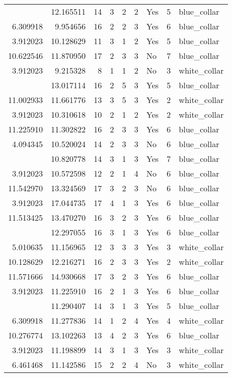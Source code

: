 \documentclass[
]{article}
\begin{document}
\begin{longtable}[t]{rrrrrllrl}
\addlinespace
10.128629 & 12.165511 & 14 & 3 & 2 & 2 & Yes & 5 & blue\_collar\\
6.309918 & 9.954656 & 16 & 2 & 2 & 3 & Yes & 6 & blue\_collar\\
3.912023 & 10.128629 & 11 & 3 & 1 & 2 & Yes & 5 & blue\_collar\\
10.622546 & 11.870950 & 17 & 2 & 3 & 3 & No & 7 & blue\_collar\\
3.912023 & 9.215328 & 8 & 1 & 1 & 2 & No & 3 & white\_collar\\
\addlinespace
10.405777 & 13.017114 & 16 & 2 & 5 & 3 & Yes & 5 & blue\_collar\\
11.002933 & 11.661776 & 13 & 3 & 5 & 3 & Yes & 2 & white\_collar\\
3.912023 & 10.310618 & 10 & 2 & 1 & 2 & Yes & 2 & white\_collar\\
11.225910 & 11.302822 & 16 & 2 & 3 & 3 & Yes & 6 & blue\_collar\\
4.094345 & 10.520024 & 14 & 2 & 3 & 3 & No & 6 & blue\_collar\\
\addlinespace
3.912023 & 10.820778 & 14 & 3 & 1 & 3 & Yes & 7 & blue\_collar\\
3.912023 & 10.572598 & 12 & 2 & 1 & 4 & No & 6 & blue\_collar\\
11.542970 & 13.324569 & 17 & 3 & 2 & 3 & No & 6 & blue\_collar\\
3.912023 & 17.044735 & 17 & 4 & 1 & 3 & Yes & 6 & blue\_collar\\
11.513425 & 13.470270 & 16 & 3 & 2 & 3 & Yes & 6 & blue\_collar\\
\addlinespace
3.912023 & 12.297055 & 16 & 3 & 1 & 3 & Yes & 6 & blue\_collar\\
5.010635 & 11.156965 & 12 & 3 & 3 & 3 & Yes & 3 & white\_collar\\
10.128629 & 12.216271 & 16 & 2 & 3 & 3 & Yes & 2 & white\_collar\\
11.571666 & 14.930668 & 17 & 3 & 2 & 3 & Yes & 6 & blue\_collar\\
3.912023 & 11.225910 & 16 & 2 & 1 & 3 & Yes & 6 & blue\_collar\\
\addlinespace
3.912023 & 11.290407 & 14 & 3 & 1 & 3 & Yes & 5 & blue\_collar\\
6.309918 & 11.277836 & 14 & 1 & 2 & 4 & Yes & 4 & white\_collar\\
10.276774 & 13.102263 & 13 & 4 & 2 & 3 & Yes & 6 & blue\_collar\\
3.912023 & 11.198899 & 14 & 3 & 1 & 3 & Yes & 3 & white\_collar\\
6.461468 & 11.142586 & 15 & 2 & 2 & 4 & No & 3 & white\_collar\\

\end{longtable}
\end{document}
